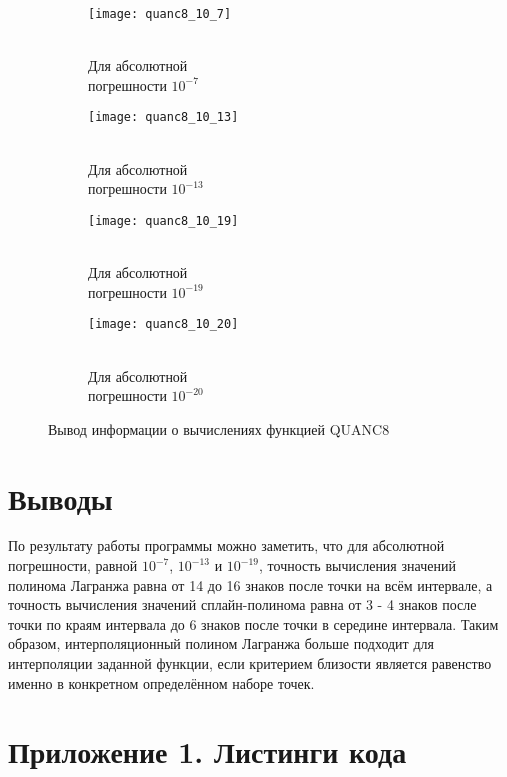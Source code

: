 \begin{figure}[H]
\begin{center}
	\begin{subfigure}[b]{0.24\textwidth}
		\texttt{[image: quanc8\_10\_7]}
		\caption{\\Для абсолютной \\погрешности $10^{-7}$}
		\label{pic:demo4:1}
	\end{subfigure}
	\begin{subfigure}[b]{0.24\textwidth}
		\texttt{[image: quanc8\_10\_13]}
		\caption{\\Для абсолютной \\погрешности $10^{-13}$}
		\label{pic:demo4:2}
	\end{subfigure}
	\begin{subfigure}[b]{0.24\textwidth}
		\texttt{[image: quanc8\_10\_19]}
		\captionsetup{justification=centering}
		\caption{\\Для абсолютной \\погрешности $10^{-19}$}
		\label{pic:demo4:3}
	\end{subfigure}
	\begin{subfigure}[b]{0.24\textwidth}
		\texttt{[image: quanc8\_10\_20]}
		\captionsetup{justification=centering}
		\caption{\\Для абсолютной \\погрешности $10^{-20}$}
		\label{pic:demo4:4}
	\end{subfigure}
	\caption{Вывод информации о вычислениях функцией QUANC8}
	\label{pic:demo4}
\end{center}
\end{figure}

\section{Выводы}

По результату работы программы можно заметить, что для абсолютной погрешности, равной $10^{-7}$, $10^{-13}$ и $10^{-19}$, точность вычисления значений полинома Лагранжа равна от 14 до 16 знаков после точки на всём интервале, а точность вычисления значений сплайн-полинома равна от 3 - 4 знаков после точки по краям интервала до 6 знаков после точки в середине интервала. Таким образом, интерполяционный полином Лагранжа больше подходит для интерполяции заданной функции, если критерием близости является равенство именно в конкретном определённом наборе точек.%

\newpage

\section*{Приложение 1. Листинги кода}



